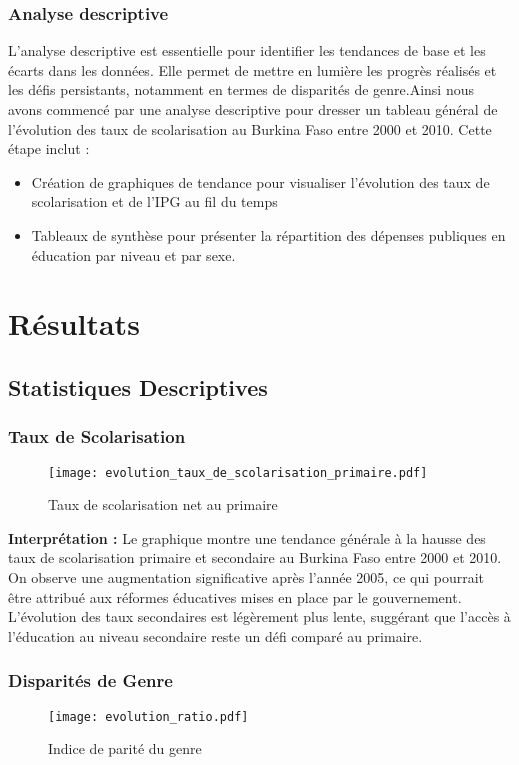 \documentclass[a4paper,12pt]{report}
\begin{document}
\subsection{Analyse descriptive}
L'analyse descriptive est essentielle pour identifier les tendances de base et les écarts dans les données. Elle permet de mettre en lumière les progrès réalisés et les défis persistants, notamment en termes de disparités de genre.Ainsi nous avons commencé par une analyse descriptive pour dresser  un tableau général de l’évolution des taux de scolarisation au Burkina Faso entre 2000 et 2010. Cette étape inclut :
\begin{itemize}
\item Création de graphiques de tendance pour visualiser l’évolution des taux de scolarisation et de l’IPG au fil du temps
\item 	Tableaux de synthèse pour présenter la répartition des dépenses publiques en éducation par niveau et par sexe.
\end{itemize}
\chapter*{Résultats }
\section{Statistiques Descriptives}
\subsection{Taux de Scolarisation}
\begin{figure}[ht]
    \centering
    \texttt{[image: evolution\_taux\_de\_scolarisation\_primaire.pdf]}
    \caption{Taux de scolarisation net au primaire}
    \label{fig:TNSP}
\end{figure}
\noindent
\textbf{Interprétation :}
Le graphique montre une tendance générale à la hausse des taux de scolarisation primaire et secondaire
au Burkina Faso entre 2000 et 2010. On observe une augmentation significative après l'année 2005,
ce qui pourrait être attribué aux réformes éducatives mises en place par le gouvernement. 
 L'évolution des taux secondaires est légèrement plus lente, suggérant que l'accès à l'éducation 
au niveau secondaire reste un défi comparé au primaire.


\subsection{Disparités de Genre}
\begin{figure}[ht]
    \centering
    \texttt{[image: evolution\_ratio.pdf]}
    \caption{Indice de parité du genre}
    \label{fig:IPG}
\end{figure}
\noindent
\end{document}
